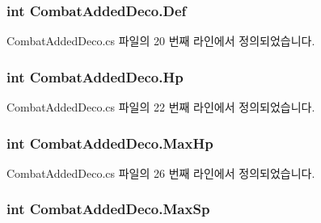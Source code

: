 \subsubsection[{\texorpdfstring{Def}{Def}}]{\setlength{\rightskip}{0pt plus 5cm}int Combat\+Added\+Deco.\+Def\hspace{0.3cm}{\ttfamily [get]}}\hypertarget{class_combat_added_deco_ac3d7d042df2e8c8cbec3d6cbcb85ae96}{}\label{class_combat_added_deco_ac3d7d042df2e8c8cbec3d6cbcb85ae96}


Combat\+Added\+Deco.\+cs 파일의 20 번째 라인에서 정의되었습니다.

\subsubsection[{\texorpdfstring{Hp}{Hp}}]{\setlength{\rightskip}{0pt plus 5cm}int Combat\+Added\+Deco.\+Hp\hspace{0.3cm}{\ttfamily [get]}}\hypertarget{class_combat_added_deco_a6810b0a4d852d7f8dc61145e2c7c9fc4}{}\label{class_combat_added_deco_a6810b0a4d852d7f8dc61145e2c7c9fc4}


Combat\+Added\+Deco.\+cs 파일의 22 번째 라인에서 정의되었습니다.

\subsubsection[{\texorpdfstring{Max\+Hp}{MaxHp}}]{\setlength{\rightskip}{0pt plus 5cm}int Combat\+Added\+Deco.\+Max\+Hp\hspace{0.3cm}{\ttfamily [get]}}\hypertarget{class_combat_added_deco_a6e24be83c5d6b04b0d900103bb398d2e}{}\label{class_combat_added_deco_a6e24be83c5d6b04b0d900103bb398d2e}


Combat\+Added\+Deco.\+cs 파일의 26 번째 라인에서 정의되었습니다.

\subsubsection[{\texorpdfstring{Max\+Sp}{MaxSp}}]{\setlength{\rightskip}{0pt plus 5cm}int Combat\+Added\+Deco.\+Max\+Sp\hspace{0.3cm}{\ttfamily [get]}}\hypertarget{class_combat_added_deco_aa1dde14484472ac5d8b42d3ee9b745f2}{}\label{class_combat_added_deco_aa1dde14484472ac5d8b42d3ee9b745f2}


